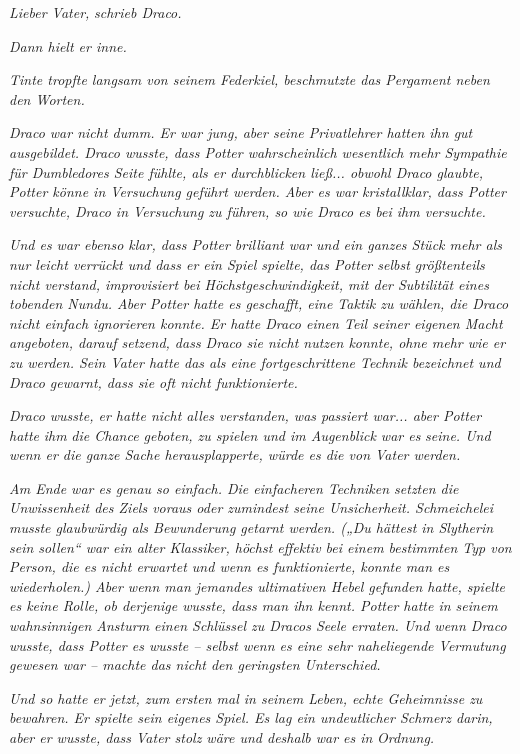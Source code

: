 {\emph{\emph{Lieber Vater,}} \emph{schrieb Draco.}

\emph{Dann hielt er inne.}

\emph{Tinte tropfte langsam von seinem Federkiel, beschmutzte das Pergament neben den Worten.}

\emph{Draco war nicht dumm. Er war jung, aber seine Privatlehrer hatten ihn gut ausgebildet. Draco wusste, dass Potter wahrscheinlich wesentlich mehr Sympathie für Dumbledores Seite fühlte, als er durchblicken ließ... obwohl Draco glaubte, Potter könne in Versuchung geführt werden. Aber es war kristallklar, dass Potter versuchte, Draco in Versuchung zu führen, so wie Draco es bei ihm versuchte.}

\emph{Und es war ebenso klar, dass Potter brilliant war und ein ganzes Stück mehr als nur leicht verrückt und dass er ein Spiel spielte, das Potter selbst größtenteils nicht verstand, improvisiert bei Höchstgeschwindigkeit, mit der Subtilität eines tobenden Nundu. Aber Potter hatte es geschafft, eine Taktik zu wählen, die Draco nicht einfach ignorieren konnte. Er hatte Draco einen Teil seiner eigenen Macht angeboten, darauf setzend, dass Draco sie nicht nutzen konnte, ohne mehr wie er zu werden. Sein Vater hatte das als eine fortgeschrittene Technik bezeichnet und Draco gewarnt, dass sie oft nicht funktionierte.}

\emph{Draco wusste, er hatte nicht alles verstanden, was passiert war... aber Potter hatte} \emph{\emph{ihm}} \emph{die Chance geboten, zu spielen und im Augenblick war es} \emph{\emph{seine}. Und wenn er die ganze Sache herausplapperte, würde es die von Vater werden.}

\emph{Am Ende war es genau so einfach. Die einfacheren Techniken setzten die Unwissenheit des Ziels voraus oder zumindest seine Unsicherheit. Schmeichelei musste glaubwürdig als Bewunderung getarnt werden. („Du hättest in Slytherin sein sollen“ war ein alter Klassiker, höchst effektiv bei einem bestimmten Typ von Person, die es nicht erwartet und wenn es funktionierte, konnte man es wiederholen.) Aber wenn man jemandes ultimativen Hebel gefunden hatte, spielte es keine Rolle, ob derjenige wusste, dass man ihn kennt. Potter hatte in seinem wahnsinnigen Ansturm einen Schlüssel zu Dracos Seele erraten. Und wenn Draco wusste, dass Potter es wusste -- selbst wenn es eine sehr naheliegende Vermutung gewesen war -- machte das nicht den geringsten Unterschied.}

\emph{Und so hatte er jetzt, zum ersten mal in seinem Leben, echte Geheimnisse zu bewahren. Er spielte sein eigenes Spiel. Es lag ein undeutlicher Schmerz darin, aber er wusste, dass Vater stolz wäre und deshalb war es in} \emph{Ordnung.}

}
